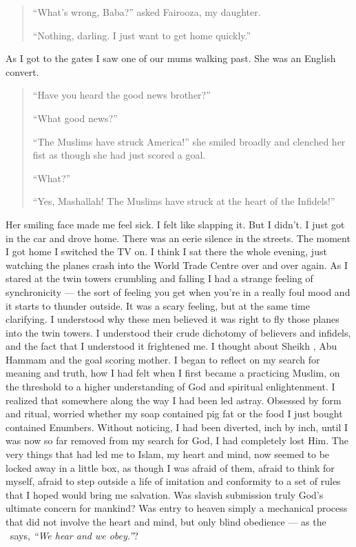 \documentclass[12pt]{memoir}
\begin{document}
\begin{quote}
“What’s wrong, Baba?” asked Fairooza, my daughter.

“Nothing, darling.
I just want to get home quickly.”
\end{quote}

As I got to the gates I saw one of our mums walking past.
She was an English convert.

\begin{quote}
“Have you heard the good news brother?”

“What good news?”

“The Muslims have struck America!” she smiled broadly
and clenched her fist as though she had just scored a goal.

“What?”

“Yes, Mashallah! The Muslims have struck at the heart of the Infidels!”
\end{quote}

Her smiling face made me feel sick.
I felt like slapping it.
But I didn’t.
I just got in the car and drove home.
There was an eerie silence in the streets.
The moment I got home I switched the TV on.
I think I sat there the whole evening, just watching the planes
crash into the World Trade Centre over and over again.
As I stared at the twin towers crumbling and falling
I had a strange feeling of synchronicity —
the sort of feeling you get when you’re in a really foul mood
and it starts to thunder outside.
It was a scary feeling, but at the same time clarifying.
I understood why these men believed it was right
to fly those planes into the twin towers.
I understood their crude dichotomy of believers and infidels,
and the fact that I understood it frightened me.
I thought about Sheikh ,
Abu Hammam and the goal scoring mother.
I began to reflect on my search for meaning and truth,
how I had felt when I first became a practicing Muslim,
on the threshold to a higher understanding of God and spiritual enlightenment.
I realized that somewhere along the way I had been led astray.
Obsessed by form and ritual, worried whether my soap contained pig fat
or the food I just bought contained E\–numbers.
Without noticing, I had been diverted, inch by inch,
until I was now so far removed from my search for God,
I had completely lost Him.
The very things that had led me to Islam, my heart and mind,
now seemed to be locked away in a little box, as though I was afraid of them,
afraid to think for myself, afraid to step outside a life of imitation
and conformity to a set of rules that I hoped would bring me salvation.
Was slavish submission truly God’s ultimate concern for mankind?
Was entry to heaven simply a mechanical process
that did not involve the heart and mind,
but only blind obedience — as the \Quran\ says,
\emph{“We hear and we obey.”}?
\end{document}
